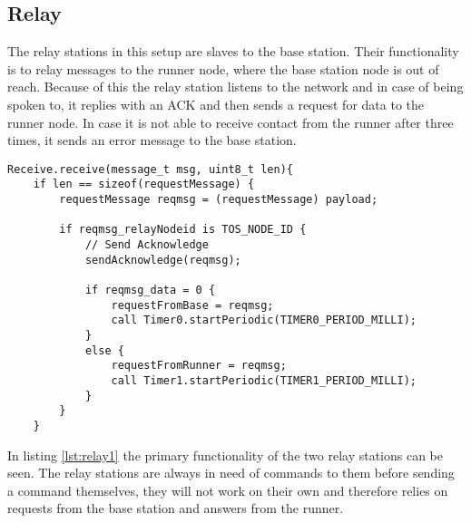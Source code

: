 \subsection{Relay}\label{sc:relay}
The relay stations in this setup are slaves to the base station. Their functionality is to relay messages to the runner node, where the base station node is out of reach. Because of this the relay station listens to the network and in case of being spoken to, it replies with an ACK and then sends a request for data to the runner node. In case it is not able to receive contact from the runner after three times, it sends an error message to the base station.

\begin{minipage}[t]{0.95\linewidth}
	\begin{lstlisting}[caption=Receive message event of Relay., label={lst:relay1}]
	Receive.receive(message_t msg, uint8_t len){
	if len == sizeof(requestMessage) {
		requestMessage reqmsg = (requestMessage) payload;
		
		if reqmsg_relayNodeid is TOS_NODE_ID {
			// Send Acknowledge
			sendAcknowledge(reqmsg);
			
			if reqmsg_data = 0 {	
				requestFromBase = reqmsg;
				call Timer0.startPeriodic(TIMER0_PERIOD_MILLI);		
			}
			else {
				requestFromRunner = reqmsg;
				call Timer1.startPeriodic(TIMER1_PERIOD_MILLI);
			}
		}
	}
	\end{lstlisting}
\end{minipage}

\noindent In listing \ref{lst:relay1} the primary functionality of the two relay stations can be seen. The relay stations are always in need of commands to them before sending a command themselves, they will not work on their own and therefore relies on requests from the base station and answers from the runner.